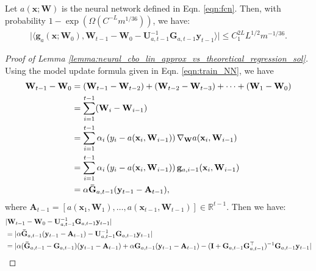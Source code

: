 \begin{lemma} Let $a(\mathbf{x}; \mathbf{W})$ is the neural network defined in Eqn. \ref{eqn:fcn}. Then, with probability $1 - \exp (\Omega(C^{-L} m^{1/36}))$, we have: 
\label{lemma:neural_cbo_lin_approx_vs_theoretical_regression_sol}
    \begin{align*}
    \lvert \langle \mathbf{g}_a(\mathbf{x};\mathbf{W}_0), \mathbf{W}_{t-1} - \mathbf{W}_0 - \mathbf{U}_{a,t-1}^{-1} \mathbf{G}_{a,t-1} \mathbf{y}_{t-1} \rangle \rvert \le C_1^{2L} L^{1/2} m^{-1/36}.
    \end{align*}
\end{lemma}
\begin{proof}[Proof of Lemma \ref{lemma:neural_cbo_lin_approx_vs_theoretical_regression_sol}]
Using the model update formula given in Eqn. \ref{eqn:train_NN}, we have 
\begin{align*}
    \mathbf{W}_{t-1} - \mathbf{W}_0 &= (\mathbf{W}_{t-1} - \mathbf{W}_{t-2}) + (\mathbf{W}_{t-2} - \mathbf{W}_{t-3})  + \dots + (\mathbf{W}_1 - \mathbf{W}_0) 
    \\
    &= \sum_{i=1}^{t-1}  (\mathbf{W}_{i} -  \mathbf{W}_{i-1}) 
    \\
    &= \sum_{i=1}^{t-1}  \alpha_i \left(y_i - a(\mathbf{x}_i, \mathbf{W}_{i-1})\right) \nabla_\mathbf{W} a(\mathbf{x}_i, \mathbf{W}_{i-1}) 
    \\
    & = \sum_{i=1}^{t-1}  \alpha_i \left(y_i - a(\mathbf{x}_i, \mathbf{W}_{i-1})\right) \mathbf{g}_{a, i-1} (\mathbf{x}_i, \mathbf{W}_{i-1}) 
    \\
    & = \alpha \mathbf{\Bar{G}}_{a, t-1} (\mathbf{y}_{t-1} - \mathbf{A}_{t-1}),
\end{align*}
where $\mathbf{A}_{t-1} = [a(\mathbf{x}_1, \mathbf{W}_1), \dots, a(\mathbf{x}_{t-1}, \mathbf{W}_{t-1})] \in \mathbb{R}^{t-1}$.  Then we have:
\begin{align*}
    & \lvert \mathbf{W}_{t-1} - \mathbf{W}_0 - \mathbf{U}_{a,t-1}^{-1}
    \mathbf{G}_{a,t-1} \mathbf{y}_{t-1} \rvert 
    \\
    & = \lvert  \alpha \mathbf{\Bar{G}}_{a, t-1} (\mathbf{y}_{t-1} - \mathbf{A}_{t-1}) - \mathbf{U}_{a,t-1}^{-1} \mathbf{G}_{a,t-1} \mathbf{y}_{t-1} \rvert 
    \\
    & = \lvert  \alpha (\mathbf{\Bar{G}}_{a, t-1} - \mathbf{G}_{a, t-1}) (\mathbf{y}_{t-1} - \mathbf{A}_{t-1}) + \alpha \mathbf{G}_{a, t-1} (\mathbf{y}_{t-1} - \mathbf{A}_{t-1}) - (\mathbf{I} + \mathbf{G}_{a,t-1} \mathbf{G}_{a,t-1}^\top)^{-1} \mathbf{G}_{a,t-1} \mathbf{y}_{t-1} \rvert
    \\

\end{align*}
\end{proof}
